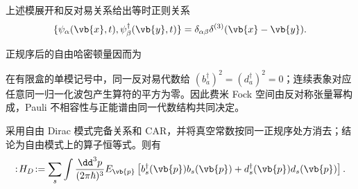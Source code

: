 \begin{proposition}[正则归一化与正能粒子谱]
上述模展开和反对易关系给出等时正则关系
\begin{equation*}
\{\psi_\alpha(\vb{x},t),\psi_\beta^\dagger(\vb{y},t)\}
=\delta_{\alpha\beta}\delta^{(3)}(\vb{x}-\vb{y}).
\end{equation*}

正规序后的自由哈密顿量因而为

在有限盒的单模记号中，同一反对易代数给 $(b_a^\dagger)^2=(d_a^\dagger)^2=0$；连续表象对应任意同一归一化波包产生算符的平方为零。因此费米 Fock 空间由反对称张量幂构成，Pauli 不相容性与正能谱由同一代数结构共同决定。
\end{proposition}

\begin{proposition}
采用自由 Dirac 模式完备关系和 CAR，并将真空常数按同一正规序处方消去；结论为自由模式上的算子恒等式。则有
\begin{equation}
{
:\!H_D\!:
=\sum_s\int\frac{\dd^3 p}{(2\pi\hbar)^3}E_{\vb{p}}
\left[b_s^\dagger(\vb{p})b_s(\vb{p})
+d_s^\dagger(\vb{p})d_s(\vb{p})\right].}
\label{eq:dirac-H-positive-r2}
\end{equation}
\end{proposition}
